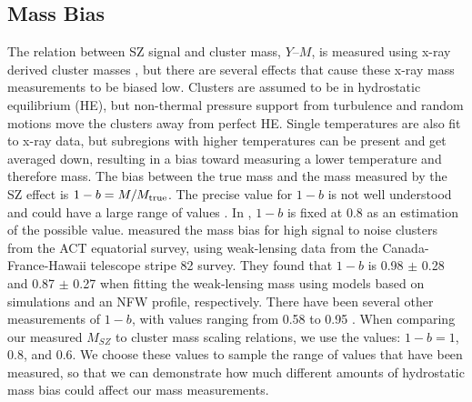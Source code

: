 \documentclass[a4paper,fleqn,usenatbib]{mnras}
\begin{document}
\subsection{Mass Bias}
The relation between SZ signal and cluster mass, $Y$--$M$, is measured using x-ray derived cluster masses \citep{2010A&A...517A..92A, 2011ApJ...738...48A}, but there are several effects that cause these x-ray mass measurements to be biased low. Clusters are assumed to be in hydrostatic equilibrium (HE), but non-thermal pressure support from turbulence and random motions move the clusters away from perfect HE. Single temperatures are also fit to x-ray data, but subregions with higher temperatures can be present and get averaged down, resulting in a bias toward measuring a lower temperature and therefore mass. The bias between the true mass and the mass measured by the SZ effect is $1-b = M/M_{\rm true}$. The precise value for $1-b$ is not well understood and could have a large range of values \citep{2014A&A...571A..16P}. In \cite{2014A&A...571A..16P}, $1-b$ is fixed at 0.8 as an estimation of the possible value. \cite{2016JCAP...08..013B} measured the mass bias for high signal to noise clusters from the ACT equatorial survey, using weak-lensing data from the Canada-France-Hawaii telescope stripe 82 survey. They found that $1-b$ is 0.98 $\pm$ 0.28 and 0.87 $\pm$ 0.27 when fitting the weak-lensing mass using models based on simulations and an NFW profile, respectively. There have been several other measurements of $1-b$, with values ranging from 0.58 to 0.95 \citep{2014MNRAS.443.1973V,2015MNRAS.449..685H,2016MNRAS.456L..74S,2016A&A...594A..24P}. When comparing our measured $M_{SZ}$ to cluster mass scaling relations, we use the values: $1-b = 1$, 0.8, and 0.6. We choose these values to sample the range of values that have been measured, so that we can demonstrate how much different amounts of hydrostatic mass bias could affect our mass measurements. 
\end{document}
